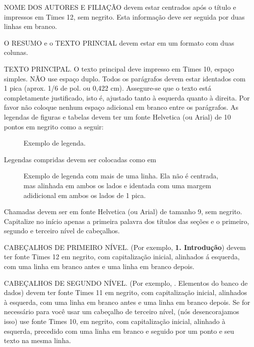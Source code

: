 \documentclass[10pt,twocolumn]{article}
\begin{document}
NOME DOS AUTORES E FILIAÇÃO devem estar centrados após o título e impressos
em Times 12, sem negrito. Esta informação deve ser seguida por duas linhas 
em branco. 

O RESUMO e o TEXTO PRINCIAL devem estar em um formato com duas colunas.

TEXTO PRINCIPAL. O texto principal deve impresso em Times 10, espaço simples. 
NÃO use espaço duplo. Todos os parágrafos devem estar identados com 
1 pica (aprox. 1/6 de pol. ou 0,422 cm). Assegure-se que o texto
está completamente justificado, isto é, ajustado tanto à esquerda quanto
à direita. Por favor não coloque nenhum espaço adicional em branco entre
os parágrafos. As legendas de figuras e tabelas devem ter um fonte Helvetica
(ou Arial) de 10 pontos em negrito como a seguir:  

\begin{figure}[h]
   \caption{Exemplo de legenda.}
\end{figure}

\noindent Legendas compridas devem ser colocadas como em  
\begin{figure}[h] 
   \caption{Exemplo de legenda com mais de uma linha. Ela não é 
      centrada, mas alinhada em ambos os lados e identada com 
      uma margem adidicional em ambos os lados de 1 pica.}
\end{figure}

\noindent Chamadas devem ser em fonte Helvetica (ou Arial) de tamanho 
9, sem negrito. Capitalize no início apenas a primeira palavra dos 
títulos das seções e o primeiro, segundo e terceiro nível de cabeçalhos.

CABEÇALHOS DE PRIMEIRO NÍVEL. (Por exemplo, {\large \bf 1. Introdução}) 
devem ter fonte Times 12 em negrito, com capitalização inicial, 
alinhados á esquerda, com uma linha em branco antes e uma linha em branco depois. 

CABEÇALHOS DE SEGUNDO NÍVEL. (Por exemplo, {. Elementos do banco de dados}) 
devem ter fonte Times 11 em negrito, com capitalização inicial, alinhados
à esquerda, com uma linha em branco antes e uma linha em branco depois. 
Se for necessário para você usar um cabeçalho de terceiro nível, 
(nós desencorajamos isso) use fonte Times 10, em negrito, com capitalização inicial,
alinhado à esquerda, precedido com uma linha em branco e seguido por um ponto e 
seu texto na mesma linha.

\end{document}
